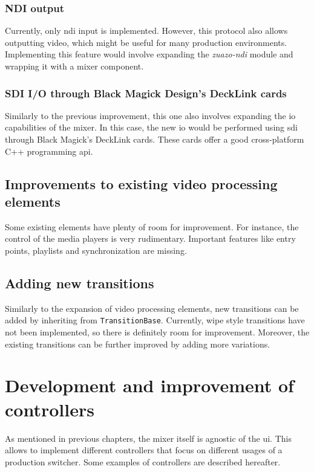\documentclass[../main.tex]{subfiles}
\begin{document}
\subsubsection{NDI output}
Currently, only \gls{ndi} input is implemented. However, this protocol also allows outputting video, which might be useful for many production environments. Implementing this feature would involve expanding the \textit{zuazo-ndi} module and wrapping it with a mixer component.\newline

\subsubsection{SDI I/O through Black Magick Design's DeckLink cards}
Similarly to the previous improvement, this one also involves expanding the \gls{io} capabilities of the mixer. In this case, the new \gls{io} would be performed using \gls{sdi} through Black Magick's DeckLink cards. These cards offer a good cross-platform C++ programming \gls{api}.\newline

\subsection{Improvements to existing video processing elements}
Some existing elements have plenty of room for improvement. For instance, the control of the media players is very rudimentary. Important features like entry points, playlists and synchronization are missing.\newline

\subsection{Adding new transitions}
Similarly to the expansion of video processing elements, new transitions can be added by inheriting from \texttt{TransitionBase}. Currently, wipe style transitions have not been implemented, so there is definitely room for improvement. Moreover, the existing transitions can be further improved by adding more variations.\newline

\section{Development and improvement of controllers}
As mentioned in previous chapters, the mixer itself is agnostic of the \gls{ui}. This allows to implement different controllers that focus on different usages of a production switcher. Some examples of controllers are described hereafter.\newline
\end{document}
